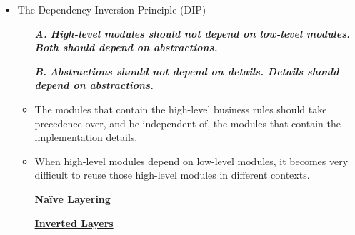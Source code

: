 \begin{itemize}
	\item The Dependency-Inversion Principle (DIP)
	\begin{enumerate}
		\item[\textbf{\textit{A.}}]  \textbf{\textit{High-level modules should not depend on low-level modules. Both should depend on abstractions.}}
		\item[\textbf{\textit{B.}}] \textbf{\textit{Abstractions should not depend on details. Details should depend on abstractions.}}
	\end{enumerate}
	\begin{itemize}
		\item The modules that contain the high-level business rules should take precedence over, and be independent of, the modules that contain the implementation details.
		\item When high-level modules depend on low-level modules, it becomes very difficult to reuse those high-level modules in different contexts.\\
		\begin{minipage}[t]{0.4\textwidth}
			\begin{center}
				\underline{\textbf{Naïve Layering}}\\
			\end{center}
		\end{minipage}
		\begin{minipage}[t]{0.5\textwidth}
			\begin{center}
				\underline{\textbf{Inverted Layers}}\\
\end{center}
\end{minipage}
\end{itemize}
\end{itemize}

